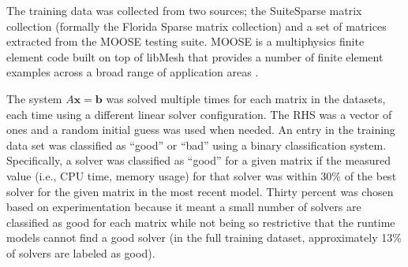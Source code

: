 

The training data was collected from two sources; the SuiteSparse matrix collection (formally the Florida Sparse matrix collection) and a set of matrices extracted from the MOOSE testing suite. MOOSE is a multiphysics finite element code built on top of libMesh that provides a number of finite element examples across a broad range of application areas \cite{MOOSE}. 

The system $A\mathbf{x} = \mathbf{b}$ was solved multiple times for each matrix in the datasets, each time using a different linear solver configuration. The RHS was a vector of ones and a random initial guess was used when needed. An entry in the training data set was classified as ``good'' or ``bad'' using a binary classification system. Specifically, a solver was classified as ``good'' for a given matrix if the measured value (i.e., CPU time, memory usage) for that solver was within $30\%$ of the best solver for the given matrix in the most recent model. Thirty percent was chosen based on experimentation because it meant a small number of solvers are classified as good for each matrix while not being so restrictive that the runtime models cannot find a good solver (in the full training dataset, approximately 13\% of solvers are labeled as good).


